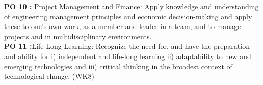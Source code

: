 \begin{center}
\begin{minipage}{0.92\textwidth}
\textbf{PO 10 :} Project Management and Finance: Apply knowledge and understanding of engineering management principles and economic decision-making and apply these to one’s own work, as a member and leader in a team, and to manage projects and in multidisciplinary environments.\\
\textbf{PO 11 :}Life-Long Learning: Recognize the need for, and have the preparation and ability for i) independent and life-long learning ii) adaptability to new and emerging technologies and iii) critical thinking in the broadest context of technological change. (WK8)


\end{minipage}

\end{center}



